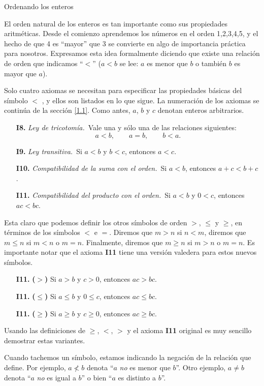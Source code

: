 \documentclass[11pt,spanish,makeidx]{amsbook}
\theoremstyle{definition}
\theoremstyle{remark}
\begin{document}
\begin{section}{Ordenando los enteros}\label{1.2}

El orden natural de los enteros es tan importante como sus propiedades aritméticas. Desde el comienzo aprendemos los números en el orden 1,2,3,4,5, y el hecho de que 4 es ``mayor'' que 3 se convierte en algo de importancia práctica para nosotros. Expresamos esta idea formalmente diciendo que existe una relación de orden que indicamos ``$<$'' ($a < b$ se lee: $a$ es menor que $b$ o también $b$ es mayor que $a$). 

Solo cuatro axiomas se necesitan para especificar las propiedades básicas del símbolo $<$ , y ellos son listados en lo que sigue. La numeración de los axiomas se continúa de la sección \ref{1.1}. Como antes, $a$, $b$ y $c$ denotan enteros arbitrarios. 
\begin{enumerate}
\item[{\bf I8.}] {\em Ley de tricotomía.}\, Vale una y sólo una de las relaciones
siguientes:
$$
a<b, \qquad a = b, \qquad b < a.
$$
\item[{\bf I9.}] {\em Ley transitiva.}\, Si $a< b$ y $b < c$, entonces $a<c$.
\item[{\bf I10.}] {\em Compatibilidad de la suma con el orden.}\, Si $a < b$, entonces $a+c < b+c$. 
\item[{\bf I11.}] {\em Compatibilidad del producto con el orden.}\, Si $a< b$ y $0< c$, entonces $ac < bc$. 
\end{enumerate}

Esta claro que podemos definir los otros símbolos de orden $>$, $\le$ y $\ge$, en términos de los símbolos $<$ e $=$. Diremos que $m>n$ si  $n<m$, diremos que $m \le n$ si $m<n$ o $m=n$. Finalmente, diremos que $m \ge n$ si $m > n$ o $m=n$.  Es importante notar que el  axioma {\bf I11} tiene una versión valedera para estos nuevos símbolos.
\begin{enumerate}
\item[{\bf I11.}] {\bf ($>$)} Si $a > b$ y $c>0$, entonces $ac > bc$.
\item[{\bf I11.}] {\bf ($\le$)} Si $a \le b$ y $0 \le c$, entonces $ac \le bc$.
\item[{\bf I11.}] {\bf ($\ge$)} Si $a\ge b$ y $c\ge 0$, entonces $ac \ge bc$.
\end{enumerate}
Usando las definiciones de $\ge$, $<$, $>$ y el axioma {\bf I11} original es muy sencillo demostrar estas variantes. 

Cuando tachemos un símbolo, estamos indicando la negación de la relación que define. Por ejemplo, $a\not< b$ denota ``$a$ {\em no} es menor que $b$''. Otro ejemplo, $a\not= b$ denota  ``$a$ {\em no} es igual a $b$'' o bien ``$a$ es distinto a $b$''. 


\end{section}
\end{document}
